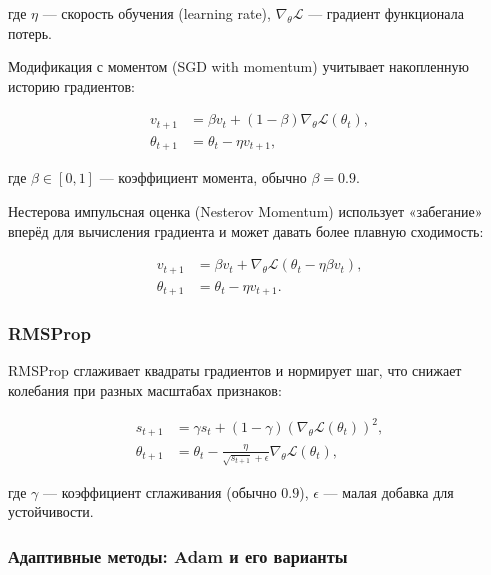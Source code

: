 где $\eta$ — скорость обучения (learning rate), $\nabla_{\theta} \mathcal{L}$ — градиент функционала потерь.

Модификация с моментом (SGD with momentum) учитывает накопленную историю градиентов:

\begin{equation}
\begin{aligned}
v_{t+1} &= \beta v_t + (1-\beta) \nabla_{\theta} \mathcal{L}(\theta_t), \\
\theta_{t+1} &= \theta_t - \eta v_{t+1},
\end{aligned}
\end{equation}

где $\beta \in [0,1]$ — коэффициент момента, обычно $\beta = 0.9$.

Нестерова импульсная оценка (Nesterov Momentum) использует «забегание» вперёд для вычисления градиента и может давать более плавную сходимость:

\begin{equation}
\begin{aligned}
v_{t+1} &= \beta v_t + \nabla_{\theta} \mathcal{L}(\theta_t - \eta \beta v_t), \\
\theta_{t+1} &= \theta_t - \eta v_{t+1}.
\end{aligned}
\end{equation}

\subsubsection{RMSProp}

RMSProp сглаживает квадраты градиентов и нормирует шаг, что снижает колебания при разных масштабах признаков:

\begin{equation}
\begin{aligned}
s_{t+1} &= \gamma s_t + (1-\gamma) (\nabla_{\theta} \mathcal{L}(\theta_t))^2, \\
\theta_{t+1} &= \theta_t - \frac{\eta}{\sqrt{s_{t+1}} + \epsilon} \nabla_{\theta} \mathcal{L}(\theta_t),
\end{aligned}
\end{equation}

где $\gamma$ — коэффициент сглаживания (обычно $0.9$), $\epsilon$ — малая добавка для устойчивости.

\subsubsection{Адаптивные методы: Adam и его варианты}

